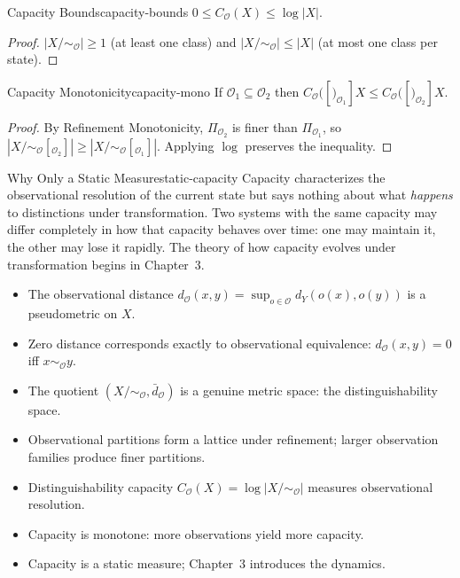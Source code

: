 \documentclass[12pt,twoside,openright]{book}
\newcommand{\obs}{\mathcal{O}}
\newcommand{\distMetric}{d_{\mathcal{O}}}
\newenvironment{chapsummary}{%
  \begin{tcolorbox}[colback=DistBlue!5,colframe=DistBlue,
    title={\faBookOpen\enspace Summary},
    fonttitle=\sffamily\bfseries\color{white},
    attach boxed title to top left={yshift=-2mm,xshift=4mm},
    boxed title style={colback=DistBlue,rounded corners}]
  \begin{itemize}[nosep,leftmargin=*]}{%
  \end{itemize}\end{tcolorbox}}
\providecommand{\quotientObs}{X/{\sim_{\obs}}}
\providecommand{\capObs}[1]{C_{\obs}(#1)}
\begin{document}
\begin{theorem}{Capacity Bounds}{capacity-bounds}
$0\le\capObs{X}\le\log|X|$.
\begin{proof}
$|\quotientObs|\ge 1$ (at least one class) and
$|\quotientObs|\le|X|$ (at most one class per state).
\end{proof}
\end{theorem}

\begin{theorem}{Capacity Monotonicity}{capacity-mono}
If $\obs_1\subseteq\obs_2$ then $\capObs[_{\obs_1}]{X}\le
\capObs[_{\obs_2}]{X}$.
\begin{proof}
By Refinement Monotonicity, $\Pi_{\obs_2}$ is finer than
$\Pi_{\obs_1}$, so $|\quotientObs[_{\obs_2}]|\ge
|\quotientObs[_{\obs_1}]|$. Applying $\log$ preserves the
inequality.
\end{proof}
\end{theorem}

\begin{remark}{Why Only a Static Measure}{static-capacity}
Capacity characterizes the observational resolution of the
current state but says nothing about what \emph{happens} to
distinctions under transformation. Two systems with the same
capacity may differ completely in how that capacity behaves
over time: one may maintain it, the other may lose it rapidly.
The theory of how capacity evolves under transformation begins
in Chapter~3.
\end{remark}

\begin{chapsummary}
\item The observational distance $\distMetric(x,y)=\sup_{o\in\obs}
  d_Y(o(x),o(y))$ is a pseudometric on $X$.
\item Zero distance corresponds exactly to observational
  equivalence: $\distMetric(x,y)=0$ iff $x\sim_\obs y$.
\item The quotient $(\quotientObs,\bar{d}_\obs)$ is a genuine
  metric space: the distinguishability space.
\item Observational partitions form a lattice under refinement;
  larger observation families produce finer partitions.
\item Distinguishability capacity $\capObs{X}=\log|\quotientObs|$
  measures observational resolution.
\item Capacity is monotone: more observations yield more
  capacity.
\item Capacity is a static measure; Chapter~3 introduces
  the dynamics.
\end{chapsummary}
\end{document}
